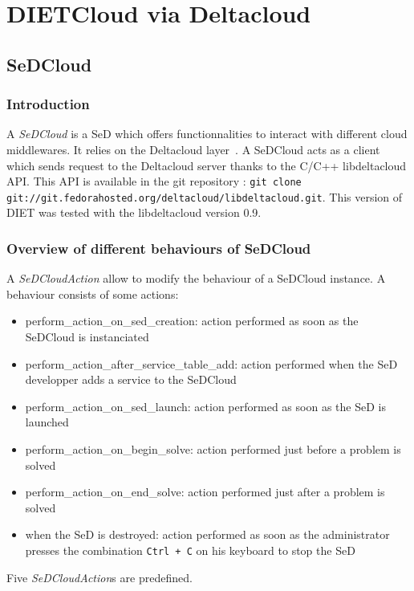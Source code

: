 

\chapter{DIETCloud via Deltacloud}\label{chapter:Deltacloud}




\section{SeDCloud}

\subsection{Introduction}

A \emph{SeDCloud} is a SeD which offers functionnalities to interact with
different cloud middlewares. It relies on the Deltacloud
layer~\cite{Deltacloud}.  A SeDCloud acts as a client which sends
request to the Deltacloud server thanks to the C/C++ libdeltacloud
API. This API is available in the git repository : \texttt{git clone
  git://git.fedorahosted.org/deltacloud/libdeltacloud.git}.
This version of DIET was tested with the libdeltacloud version 0.9.

\subsection{Overview of different behaviours of SeDCloud}

 
A \emph{SeDCloudAction} allow to modify the behaviour of a SeDCloud
instance. A behaviour consists of some actions: 
\begin{itemize}
  \item perform\_action\_on\_sed\_creation: action performed as soon as the SeDCloud is instanciated
  \item perform\_action\_after\_service\_table\_add: action performed when the SeD developper adds a service to the SeDCloud
  \item perform\_action\_on\_sed\_launch: action performed as soon as the SeD is launched
  \item perform\_action\_on\_begin\_solve: action performed just before a problem is solved
  \item perform\_action\_on\_end\_solve: action performed just after a problem is solved
  \item when the SeD is destroyed: action performed as soon as the
    administrator presses the combination \texttt{Ctrl + C} on his keyboard to stop the SeD
\end{itemize}
Five \emph{SeDCloudAction}s are predefined.


